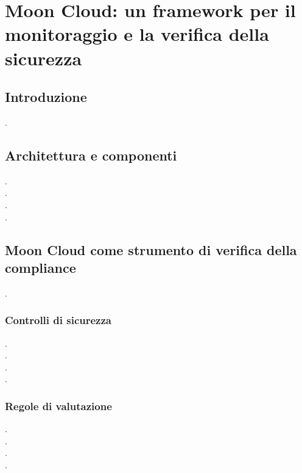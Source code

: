 \documentclass[../main.tex]{subfiles}
\begin{document}
\chapter{Moon Cloud: un framework per il monitoraggio e la verifica della sicurezza}
\section{Introduzione}
\newpage
.\\\newpage
\section{Architettura e componenti}
\newpage
.\\\newpage
.\\\newpage
.\\\newpage
.\\\newpage
\section{Moon Cloud come strumento di verifica della compliance}
\newpage
.\\\newpage
\subsection{Controlli di sicurezza}
\newpage
.\\\newpage
.\\\newpage
.\\\newpage
.\\\newpage
\subsection{Regole di valutazione}
\newpage
.\\\newpage
.\\\newpage
.\\\newpage
.\\\newpage
\end{document}
